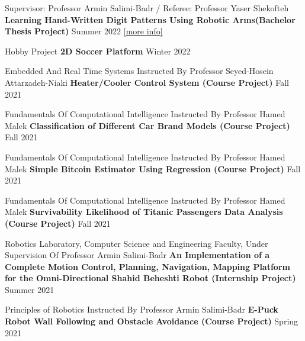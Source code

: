 \begin{cventries}
    \cventry
    {Supervisor: Professor Armin Salimi-Badr / Referee: Professor Yaser Shekofteh}
    {\textbf {Learning Hand-Written Digit Patterns Using Robotic Arms(Bachelor Thesis Project)}}
    {}
    {Summer 2022}
    {\href{https://ph504.github.io/portfolio/portfolio-1/}{\textcolor{cobalt}{[more info]}}\newline}
    \vspace{0.35 cm}
    
    \cventry
    {Hobby Project}
    {\textbf {2D Soccer Platform}}
    {}
    {Winter 2022}
    {}
    \vspace{0.35 cm}
    
    \cventry
    {Embedded And Real Time Systems Instructed By Professor Seyed-Hosein Attarzadeh-Niaki}
    {\textbf {Heater/Cooler Control System (Course Project)}}
    {}
    {Fall 2021}
    {}
    \vspace{0.35 cm}
    
      \cventry
    {Fundamentals Of Computational Intelligence Instructed By Professor Hamed Malek}
    {\textbf {Classification of Different Car Brand Models (Course Project)}}
    {}
    {Fall 2021}
    {}
    \vspace{0.35 cm}

    {Fundamentals Of Computational Intelligence Instructed By Professor Hamed Malek}
    {\textbf {Simple Bitcoin Estimator Using Regression (Course Project)}}
    {}
    {Fall 2021}
    {}
    \vspace{0.35 cm}

    {Fundamentals Of Computational Intelligence Instructed By Professor Hamed Malek}
    {\textbf {Survivability Likelihood of Titanic Passengers Data Analysis (Course Project)}}
    {}
    {Fall 2021}
    {}
    \vspace{0.35 cm}
    
     \cventry
    {Robotics Laboratory, Computer Science and Engineering Faculty, Under Supervision Of Professor Armin Salimi-Badr}
    {\textbf {An Implementation of a Complete Motion Control, Planning, Navigation, Mapping Platform for the Omni-Directional Shahid Beheshti Robot (Internship Project)}}
    {}
    {Summer 2021}
    {}
    \vspace{0.35 cm}
    
    \cventry
    {Principles of Robotics Instructed By Professor Armin Salimi-Badr}
    {\textbf {E-Puck Robot Wall Following and Obstacle Avoidance (Course Project)}}
    {}
    {Spring 2021}
    {}
    \vspace{0.35 cm}
        

\end{cventries}
